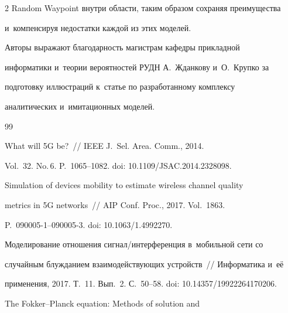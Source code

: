 \begin{multicols}{2}
Random Waypoint внутри об\-ласти, таким образом сохраняя преимущества 

и~компенсируя недостатки каж\-дой из этих моделей.



\bigskip



Авторы выражают благодарность магистрам кафедры прикладной 

информатики и~тео\-рии вероятностей РУДН А.~Жданкову и~О.~Крупко за 

подготовку иллюстраций к~статье по разработанному комплексу 

аналитических и~имитационных моделей.

  

{\small\frenchspacing

 {%


 \begin{thebibliography}{99}


 What will 5G be?~// IEEE J.~Sel. Area. Comm., 2014. 

Vol.~32. No.\,6. P.~1065--1082. doi: 10.1109/JSAC.2014.2328098.


 Simulation of devices mobility to estimate wireless channel quality 

metrics in 5G networks~// AIP Conf. Proc., 2017. Vol.~1863.  

P.~090005-1--090005-3. doi: 10.1063/1.4992270.



Моделирование отношения сиг\-нал/ин\-тер\-фе\-рен\-ция в~мобильной сети со 

случайным блужданием взаимодействующих устройств~// Информатика и~её 

применения, 2017. Т.~11. Вып.~2. С.~50--58. doi: 10.14357/19922264170206.


 The Fokker--Planck equation: Methods of solution and 


\end{thebibliography}}}
\end{multicols}
